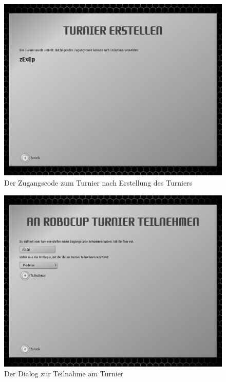 \begin{figure}
  \centering
  \label{create-tournment-code}
  \includegraphics[width=15cm, keepaspectratio]{figures/7-turnier-erstellen-code.png}
  \caption{Der Zugangscode zum Turnier nach Erstellung des Turniers}
\end{figure}

\begin{figure}
  \centering
  \label{participate-tournament}
  \includegraphics[width=15cm, keepaspectratio]{figures/9-turnierteilnahme.png}
  \caption{Der Dialog zur Teilnahme am Turnier}
\end{figure}

